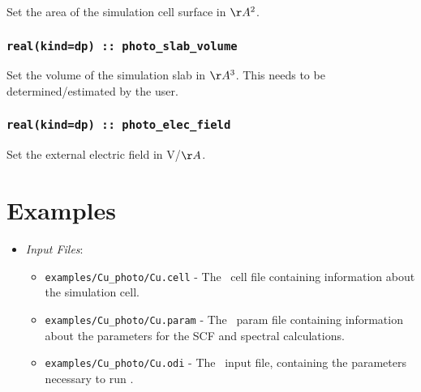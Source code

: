 \documentclass[a4paper,11pt,twoside]{book}
\begin{document}
Set the area of the simulation cell surface in $\AA^2$.

\subsection[photo\_slab\_volume]{\tt real(kind=dp) :: photo\_slab\_volume}

Set the volume of the simulation slab in $\AA^3$. This needs to be determined/estimated by the user.

\subsection[photo\_elec\_field]{\tt real(kind=dp) :: photo\_elec\_field}

Set the external electric field in V/$\AA$.

\chapter{Examples}

\begin{itemize}
This is an example of using photoemission module for calculating the photoemission properties of Cu(111) surface using a 16 atomic layers slab. 
\item \emph{Input Files}:
\begin{itemize}
\item \verb#examples/Cu_photo/Cu.cell# - The \castep\ cell file containing information about the simulation cell.
\item \verb#examples/Cu_photo/Cu.param# - The \castep\ param file containing information about the parameters for the SCF and spectral calculations.
\item \verb#examples/Cu_photo/Cu.odi# - The \optados\ input file, containing the parameters necessary to run \optados.
\end{itemize}
\end{itemize}
\end{document}
